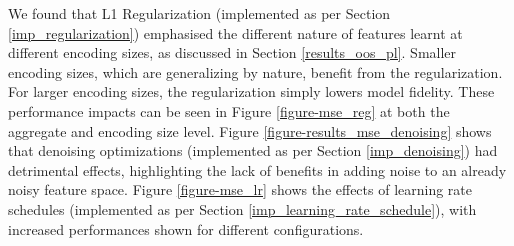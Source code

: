 \documentclass[a4paper,11pt,oneside]{article}
\theoremstyle{plain}
\theoremstyle{definition}
\begin{document}
	We found that L1 Regularization (implemented as per Section \ref{imp_regularization}) emphasised the different nature of features learnt at different encoding sizes, as discussed in Section \ref{results_oos_pl}. Smaller encoding sizes, which are generalizing by nature, benefit from the regularization. For larger encoding sizes, the regularization simply lowers model fidelity. These performance impacts can be seen in Figure \ref{figure-mse_reg} at both the aggregate and encoding size level. Figure \ref{figure-results_mse_denoising} shows that denoising optimizations (implemented as per Section \ref{imp_denoising}) had detrimental effects, highlighting the lack of benefits in adding noise to an already noisy feature space. Figure \ref{figure-mse_lr} shows the effects of learning rate schedules (implemented as per Section \ref{imp_learning_rate_schedule}), with increased performances shown for different configurations.
	
\end{document}
